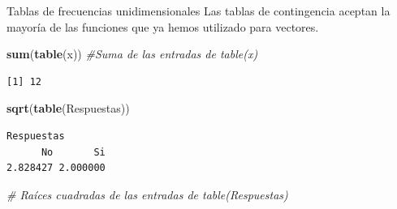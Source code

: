 \documentclass[
  ignorenonframetext,
  aspectratio=169]{beamer}
\newenvironment{Shaded}{\begin{snugshade}}{\end{snugshade}}
\newcommand{\CommentTok}[1]{\textcolor[rgb]{0.56,0.35,0.01}{\textit{#1}}}
\newcommand{\FunctionTok}[1]{\textcolor[rgb]{0.13,0.29,0.53}{\textbf{#1}}}
\newcommand{\NormalTok}[1]{#1}
\begin{document}
\begin{frame}[fragile]{Tablas de frecuencias unidimensionales}
\label{tablas-de-frecuencias-unidimensionales-7}
Las tablas de contingencia aceptan la mayoría de las funciones que ya
hemos utilizado para vectores.

\begin{Shaded}
\begin{Highlighting}[]
\FunctionTok{sum}\NormalTok{(}\FunctionTok{table}\NormalTok{(x)) }\CommentTok{\#Suma de las entradas de table(x)}
\end{Highlighting}
\end{Shaded}

\begin{verbatim}
[1] 12
\end{verbatim}

\begin{Shaded}
\begin{Highlighting}[]
\FunctionTok{sqrt}\NormalTok{(}\FunctionTok{table}\NormalTok{(Respuestas))}
\end{Highlighting}
\end{Shaded}

\begin{verbatim}
Respuestas
      No       Si 
2.828427 2.000000 
\end{verbatim}

\begin{Shaded}
\begin{Highlighting}[]
\CommentTok{\# Raíces cuadradas de las entradas de table(Respuestas)}
\end{Highlighting}
\end{Shaded}
\end{frame}
\end{document}

